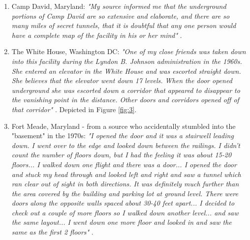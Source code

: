 \documentclass[10pt,twocolumn,letterpaper]{article}
\begin{document}
\begin{flushleft}
\begin{enumerate}
    \item Camp David, Maryland: \textit{"My source informed me that the underground portions of Camp David are so extensive and elaborate, and there are so many miles of secret tunnels, that it is doubtful that any one person would have a complete map of the facility in his or her mind"} \cite{22}.
    \item The White House, Washington DC: \textit{"One of my close friends was taken down into this facility during the Lyndon B. Johnson administration in the 1960s. She entered an elevator in the White House and was escorted straight down. She believes that the elevator went down 17 levels. When the door opened underground she was escorted down a corridor that appeared to disappear to the vanishing point in the distance. Other doors and corridors opened off of that corridor"} \cite{22}. Depicted in Figure \ref{fig:3}.
    \item Fort Meade, Maryland - from a source who accidentally stumbled into the "basement" in the 1970s: \textit{"I opened the door and it was a stairwell leading down. I went over to the edge and looked down between the railings. I didn't count the number of floors down, but I had the feeling it was about 15-20 floors... I walked down one flight and there was a door... I opened the door and stuck my head through and looked left and right and saw a tunnel which ran clear out of sight in both directions. It was definitely much further than the area covered by the building and parking lot at ground level. There were doors along the opposite walls spaced about 30-40 feet apart... I decided to check out a couple of more floors so I walked down another level... and saw the same layout... I went down one more floor and looked in and saw the same as the first 2 floors"} \cite{22}.
\end{enumerate}
\end{flushleft}
\end{document}
